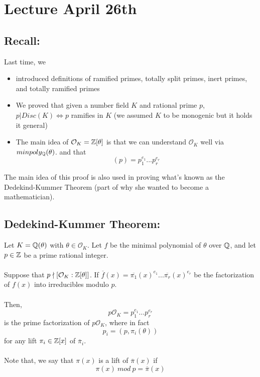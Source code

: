 \section{Lecture April 26th}

\subsection{Recall:}

Last time, we 
\begin{itemize}
    \item introduced definitions of ramified primes, totally split primes, inert primes, and totally ramified primes
    \item We proved that given a number field $K$ and rational prime $p$, $p | Disc(K) \iff p$ ramifies in $K$ (we assumed $K$ to be monogenic but it holds it general)
    \item The main idea of $\mathcal{O}_K = \mathbb{Z}[\theta]$ is that we can understand $\mathcal{O}_K$ well via $minpoly_{\mathbb{Q}}(\theta)$. and that
    \[(p) = p_1^{e_1} ... p_r^{e_r}\]
\end{itemize}

The main idea of this proof is also used in proving what's known as the Dedekind-Kummer Theorem (part of why she wanted to become a mathematician).

\subsection{Dedekind-Kummer Theorem:}

\begin{theorem}
Let $K = \mathbb{Q}(\theta)$ with $\theta \in \mathcal{O}_K$. Let $f$ be the minimal polynomial of $\theta$ over $\mathbb{Q}$, and let $p \in \mathbb{Z}$ be a prime rational integer.\\\\
Suppose that $p \nmid [\mathcal{O}_K : \mathbb{Z}[\theta]]$. If $\overline{f}(x) = \overline{\pi_1}(x)^{e_1} ... \overline{\pi_r}(x)^{e_r}$ be the factorization of $f(x)$ into irreducibles modulo $p$.\\\\
Then,
\[p\mathcal{O}_K = p_1^{e_1} ... p_r^{e_r}\]
is the prime factorization of $p\mathcal{O}_K$, where in fact
\[p_i = (p, \pi_i(\theta))\]
for any lift $\pi_i \in \mathbb{Z}[x]$ of $\overline{\pi}_i$.\\\\
Note that, we say that $\pi(x)$ is a lift of $\overline{\pi}(x)$ if
\[\pi(x)\ mod\ p = \overline{\pi}(x)\]
\end{theorem}

